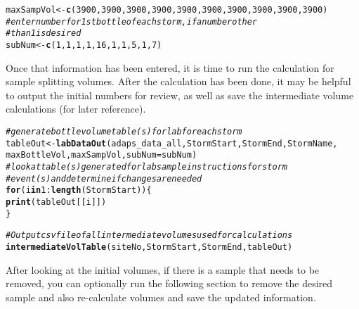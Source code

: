 \documentclass[a4paper,11pt]{article}\usepackage[]{graphicx}\usepackage[]{color}
\makeatletter
\newcommand{\hlnum}[1]{\textcolor[rgb]{0.686,0.059,0.569}{#1}}%
\newcommand{\hlcom}[1]{\textcolor[rgb]{0.678,0.584,0.686}{\textit{#1}}}%
\newcommand{\hlopt}[1]{\textcolor[rgb]{0,0,0}{#1}}%
\newcommand{\hlstd}[1]{\textcolor[rgb]{0.345,0.345,0.345}{#1}}%
\newcommand{\hlkwa}[1]{\textcolor[rgb]{0.161,0.373,0.58}{\textbf{#1}}}%
\newcommand{\hlkwb}[1]{\textcolor[rgb]{0.69,0.353,0.396}{#1}}%
\newcommand{\hlkwc}[1]{\textcolor[rgb]{0.333,0.667,0.333}{#1}}%
\newcommand{\hlkwd}[1]{\textcolor[rgb]{0.737,0.353,0.396}{\textbf{#1}}}%
\newenvironment{kframe}{%
 \def\at@end@of@kframe{}%
 \ifinner\ifhmode%
  \def\at@end@of@kframe{\end{minipage}}%
  \begin{minipage}{\columnwidth}%
 \fi\fi%
 \def\FrameCommand##1{\hskip\@totalleftmargin \hskip-\fboxsep
 \colorbox{shadecolor}{##1}\hskip-\fboxsep
     \hskip-\linewidth \hskip-\@totalleftmargin \hskip\columnwidth}%
 \MakeFramed {\advance\hsize-\width
   \@totalleftmargin\z@ \linewidth\hsize
   \@setminipage}}%
 {\par\unskip\endMakeFramed%
 \at@end@of@kframe}
\newenvironment{knitrout}{}{} %
\makeatother
\begin{document}
\begin{knitrout}
\begin{kframe}
\begin{alltt}
\hlstd{maxSampVol} \hlkwb{<-} \hlkwd{c}\hlstd{(}\hlnum{3900}\hlstd{,}\hlnum{3900}\hlstd{,}\hlnum{3900}\hlstd{,}\hlnum{3900}\hlstd{,}\hlnum{3900}\hlstd{,}\hlnum{3900}\hlstd{,}\hlnum{3900}\hlstd{,}\hlnum{3900}\hlstd{,}\hlnum{3900}\hlstd{,}\hlnum{3900}\hlstd{)}
\hlcom{# enter number for 1st bottle of each storm, if a number other }
\hlcom{# than 1 is desired}
\hlstd{subNum} \hlkwb{<-} \hlkwd{c}\hlstd{(}\hlnum{1}\hlstd{,}\hlnum{1}\hlstd{,}\hlnum{1}\hlstd{,}\hlnum{1}\hlstd{,}\hlnum{16}\hlstd{,}\hlnum{1}\hlstd{,}\hlnum{1}\hlstd{,}\hlnum{5}\hlstd{,}\hlnum{1}\hlstd{,}\hlnum{7}\hlstd{)}
\end{alltt}
\end{kframe}
\end{knitrout}

Once that information has been entered, it is time to run the calculation for sample splitting volumes. After the calculation has been done, it may be helpful to output the initial numbers for review, as well as save the intermediate volume calculations (for later reference).

\begin{knitrout}
\color{fgcolor}\begin{kframe}
\begin{alltt}
\hlcom{# generate bottle volume table(s) for lab for each storm}
\hlstd{tableOut} \hlkwb{<-} \hlkwd{labDataOut}\hlstd{(adaps_data_all,StormStart,StormEnd,StormName,}
                       \hlstd{maxBottleVol,maxSampVol,}\hlkwc{subNum}\hlstd{=subNum)}
\hlcom{# look at table(s) generated for lab sample instructions for storm }
\hlcom{# event(s) and determine if changes are needed}
\hlkwa{for} \hlstd{(i} \hlkwa{in} \hlnum{1}\hlopt{:}\hlkwd{length}\hlstd{(StormStart))\{}
  \hlkwd{print}\hlstd{(tableOut[[i]])}
\hlstd{\}}

\hlcom{#Output csv file of all intermediate volumes used for calculations}
\hlkwd{intermediateVolTable}\hlstd{(siteNo,StormStart,StormEnd,tableOut)}
\end{alltt}
\end{kframe}
\end{knitrout}

After looking at the initial volumes, if there is a sample that needs to be removed, you can optionally run the following section to remove the desired sample and also re-calculate volumes and save the updated information.
\end{document}
